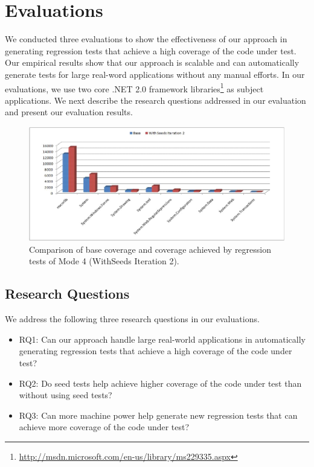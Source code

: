 \section{Evaluations}
\label{sec:eval}

We conducted three evaluations to show the effectiveness of our approach in generating regression tests that achieve a high coverage of the code under test. Our empirical results show that our approach is scalable and can automatically generate tests for large real-word applications without any manual efforts. In our evaluations,  we use two core .NET 2.0 framework libraries\footnote{\url{http://msdn.microsoft.com/en-us/library/ms229335.aspx}} as subject applications. We next describe the research questions addressed in our evaluation and present our evaluation results.

\begin{figure}[t]
\centering
\includegraphics[scale=0.70,clip]{figs/RQ2_1.eps}\vspace*{-1ex}
\caption{Comparison of base coverage and coverage achieved by regression tests of Mode 4 (WithSeeds Iteration 2).} \label{fig:rq2}
\end{figure}

\subsection{Research Questions}
\label{sec:research}

We address the following three research questions in our evaluations.

\begin{itemize}
\item RQ1: Can our approach handle large real-world applications in automatically generating regression tests that achieve a high coverage of the code under test? 
\item RQ2: Do seed tests help achieve higher coverage of the code under test than without using seed tests?
\item RQ3: Can more machine power help generate new regression tests that can achieve more coverage of the code under test?
\end{itemize}

